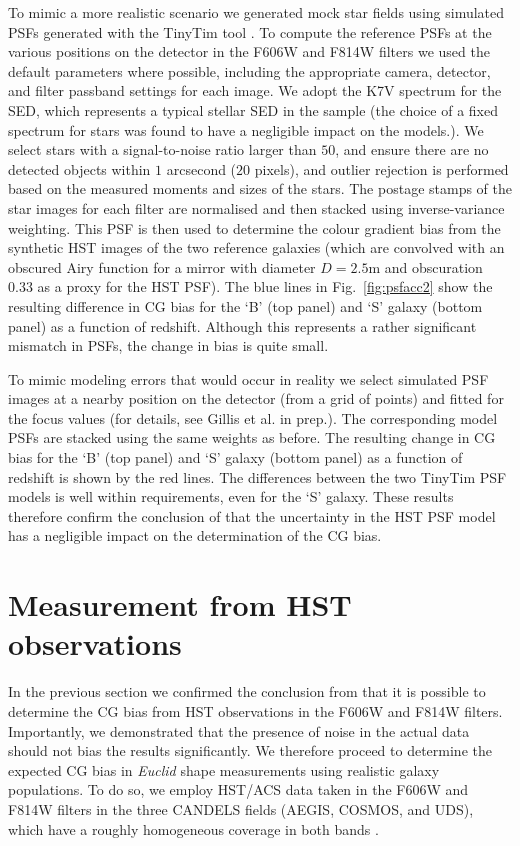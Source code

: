 \documentclass[useAMS,usenatbib]{mnras}
\begin{document}
To mimic a more realistic scenario we generated mock star fields using simulated PSFs generated with
the {\sc TinyTim} tool \citep{2011SPIE.8127E..0JK}. To compute the reference PSFs at the various positions on the detector in the F606W and F814W filters we used the default parameters where possible, including the appropriate camera, detector, and filter passband settings for each image. We adopt the K7V spectrum for the SED, which represents a typical stellar SED in the sample (the choice of a fixed spectrum for stars was found to have a negligible impact on the models.). We select stars with a signal-to-noise ratio larger than $50$, and ensure there are no detected objects within $1$ arcsecond ($20$ pixels), and outlier rejection is performed based on the measured moments and sizes of the stars. The postage stamps of the star images for each filter are normalised and then stacked using inverse-variance weighting. This PSF is then used to determine the colour gradient bias from the synthetic HST images of the two reference galaxies (which are convolved with an obscured Airy function for a mirror with diameter $D = 2.5$m and obscuration 0.33 as a proxy for the HST PSF). The blue lines in Fig.~\ref{fig:psfacc2} show the resulting difference in CG bias for the `B' (top panel) and `S' galaxy (bottom panel) as a function of redshift. Although this represents a rather significant mismatch in PSFs, the change in bias is quite small.

To mimic modeling errors that would occur in reality we select simulated PSF images at a nearby position on the detector (from a grid of points) and fitted for the focus values (for details, see Gillis et al. in prep.). The corresponding model PSFs are stacked using the same weights as before. The resulting change in CG bias for the `B' (top panel) and `S' galaxy (bottom panel) as a function of redshift is shown by the red lines. The differences between the two TinyTim PSF models is well within requirements, even for the `S' galaxy. These results therefore confirm the conclusion of   that the uncertainty in the HST PSF model has a negligible impact on the determination of the CG bias.

\section{Measurement from HST observations}
\label{sec:candels}

In the previous section we confirmed the conclusion from 
that it is possible to determine the CG bias from HST observations in the F606W
and F814W filters. Importantly, we demonstrated that the presence of noise in the
actual data should not bias the results significantly. We therefore proceed to
determine the expected CG bias in {\it Euclid} shape measurements using
realistic galaxy populations. To do so, we employ HST/ACS data taken in the F606W and F814W
filters in the three CANDELS fields (AEGIS, COSMOS, and UDS), which have
a roughly homogeneous coverage in both bands \citep[see][]{davis2007,grogin2011,Koekemoer11}.
\end{document}
